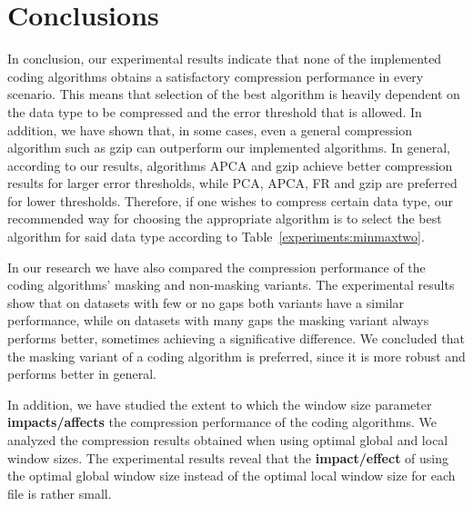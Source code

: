 
\section{Conclusions}
\label{secX:conclu}


In conclusion, our experimental results indicate that none of the implemented coding algorithms obtains a satisfactory compression performance in every scenario. This means that selection of the best algorithm is heavily dependent on the data type to be compressed and the error threshold that is allowed. In addition, we have shown that, in some cases, even a general compression algorithm such as gzip can outperform our implemented algorithms. In general, according to our results, algorithms APCA and gzip achieve better compression results for larger error thresholds, while PCA, APCA, FR and gzip are preferred for lower thresholds. Therefore, if one wishes to compress certain data type, our recommended way for choosing the appropriate algorithm is to select the best algorithm for said data type according to Table~\ref{experiments:minmaxtwo}.


In our research we have also compared the compression performance of the coding algorithms' masking and non-masking variants. The experimental results show that on datasets with few or no gaps both variants have a similar performance, while on datasets with many gaps the masking variant always performs better, sometimes achieving a significative difference. We concluded that the masking variant of a coding algorithm is preferred, since it is more robust and performs better in general.


In addition, we have studied the extent to which the window size parameter \textbf{impacts/affects} the compression performance of the coding algorithms. We analyzed the compression results obtained when using optimal global and local window sizes. The experimental results reveal that the \textbf{impact/effect} of using the optimal global window size instead of the optimal local window size for each file is rather small.

